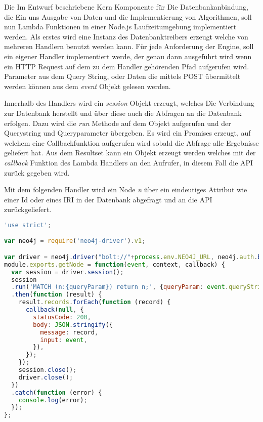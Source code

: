Die Im Entwurf beschriebene Kern Komponente für Die Datenbankanbindung, die Ein uns Ausgabe von Daten und die Implementierung von Algorithmen, soll nun Lambda Funktionen in einer Node.js Laufzeitumgebung implementiert werden. Als erstes wird eine Instanz des Datenbanktreibers erzeugt welche von mehreren Handlern benutzt werden kann. Für jede Anforderung der Engine, soll ein eigener Handler implementiert werde, der genau dann ausgeführt wird wenn ein HTTP Request auf dem zu dem Handler gehörenden Pfad aufgerufen wird. Parameter aus dem Query String, oder Daten die mittels POST übermittelt werden können aus dem \textit{event} Objekt gelesen werden. 

Innerhalb des Handlers wird ein \textit{session} Objekt erzeugt, welches Die Verbindung zur Datenbank herstellt und über diese auch die Abfragen an die Datenbank erfolgen. Dazu wird die \textit{run} Methode auf dem Objekt aufgerufen und der Querystring und Queryparameter übergeben. Es wird ein Promises erzeugt, auf welchem eine Callbackfunktion aufgerufen wird sobald die Abfrage alle Ergebnisse geliefert hat. Aus dem Resultset kann ein Objekt erzeugt werden welches mit der \textit{callback} Funktion des Lambda Handlers an den Aufrufer, in diesem Fall die API zurück gegeben wird.

Mit dem folgenden Handler wird ein Node \textit{n} über ein eindeutiges Attribut wie einer Id oder eines IRI in der Datenbank abgefragt und an die API zurückgeliefert.


\begin{lstlisting}[language=JavaScript, frame=htrbl, caption={Lambda Handler Funktion}, label={lst:lambda_handler}]
	'use strict';

var neo4j = require('neo4j-driver').v1;

var driver = neo4j.driver("bolt://"+process.env.NEO4J_URL, neo4j.auth.basic("user" ,"password"));
module.exports.getNode = function(event, context, callback) {
  var session = driver.session();
  session
  .run('MATCH (n:{queryParam}) return n;', {queryParam: event.queryStringParameters.label})
  .then(function (result) {
    result.records.forEach(function (record) {
      callback(null, {
        statusCode: 200,
        body: JSON.stringify({
          message: record,
          input: event,
        }),
      });
    });
    session.close();
    driver.close();
  })
  .catch(function (error) {
    console.log(error);
  });
};


\end{lstlisting}


